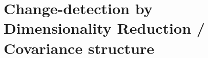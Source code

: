 \section{Change-detection by Dimensionality Reduction / Covariance structure}\label{dim-reduction}

